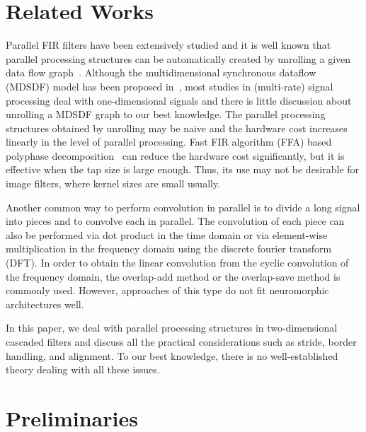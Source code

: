 \documentclass[journal]{IEEEtran}
\begin{document}
\section{Related Works} 
Parallel FIR filters have been extensively studied and it is well known that parallel processing structures can be automatically created by unrolling a given data flow graph~\cite{parhi2007vlsi}. Although the multidimensional synchronous dataflow (MDSDF) model has been proposed in~\cite{murthy2002multidimensional}, most studies in (multi-rate) signal processing deal with one-dimensional signals and there is little discussion about unrolling a MDSDF graph to our best knowledge. The parallel processing structures obtained by unrolling may be naive and the hardware cost increases linearly in the level of parallel processing. Fast FIR algorithm (FFA) based polyphase decomposition~\cite{tsao2012area} can reduce the hardware cost significantly, but it is effective when the tap size is large enough. Thus, its use may not be desirable for image filters, where kernel sizes are small usually.

Another common way to perform convolution in parallel is to divide a long signal into pieces and to convolve each in parallel. The convolution of each piece can also be performed via dot product in the time domain or via element-wise multiplication in the frequency domain using the discrete fourier transform (DFT). In order to obtain the linear convolution from the cyclic convolution of the frequency domain, the overlap-add method or the overlap-save method is commonly used. However, approaches of this type do not fit neuromorphic architectures well.

In this paper, we deal with parallel processing structures in two-dimensional cascaded filters and discuss all the practical considerations such as stride, border handling, and alignment. To our best knowledge, there is no well-established theory dealing with all these issues. 

\section{Preliminaries}
\end{document}

